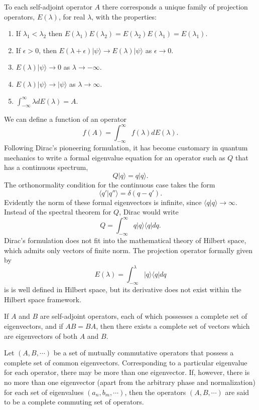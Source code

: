 \begin{newthem}
To each self-adjoint operator $A$ there corresponds a unique family of projection operators, $E(\lambda)$, for real $\lambda$, with the properties:
\begin{enumerate}
\item If $\lambda_1 < \lambda_2$ then $E(\lambda_1)E(\lambda_2) = E(\lambda_2)E(\lambda_1)= E(\lambda_1) $.
\item If $\epsilon > 0$, then $E(\lambda + \epsilon)|\psi\rangle \to E(\lambda)|\psi\rangle$ as $\epsilon \to 0$.
\item $E(\lambda)|\psi\rangle \to 0$ as $\lambda \to -\infty$.
\item $E(\lambda)|\psi\rangle \to |\psi\rangle$ as $\lambda \to \infty$.
\item $\int_{-\infty}^{\infty} \lambda dE(\lambda) = A$.
\end{enumerate}
\end{newthem}

\noindent
We can define a function of an operator
\[f(A) = \int_{-\infty}^{\infty} f(\lambda) dE(\lambda).\]
Following Dirac's pioneering formulation, it has become customary in
quantum mechanics to write a formal eigenvalue equation for an operator such as $Q$ that has a continuous spectrum,
\[Q |q\rangle = q|q\rangle.\]
The orthonormality condition for the continuous case takes the form
\[\langle q' | q'' \rangle = \delta(q-q').\]
Evidently the norm of these formal eigenvectors is infinite, since 
$\langle q | q \rangle \to \infty$. Instead of the spectral theorem for $Q$, Dirac would write
\[Q = \int_{-\infty}^{\infty} q |q\rangle\langle q| dq.\]
Dirac's formulation does not fit into the mathematical theory of Hilbert space, which admits only vectors of finite norm. The projection operator formally given by
\[E(\lambda) = \int_{-\infty}^{\lambda}  |q\rangle\langle q| dq \]
is is well defined in Hilbert space, but its derivative does not exist within the Hilbert space framework.\\


\begin{newthem}
If $A$ and $B$ are self-adjoint operators, each of which possesses a complete set of eigenvectors, and if $AB =BA$, then there exists a complete set of vectors which are eigenvectors of both $A$ and $B$.
\end{newthem}

\noindent
Let $(A, B, \cdots)$ be a set of mutually commutative operators that possess a complete set of common eigenvectors. Corresponding to a particular eigenvalue for each operator, there may be more than one eigenvector. If, however, there is no more than one eigenvector (apart from the arbitrary phase and normalization) for each set of eigenvalues $(a_n, b_m, \cdots)$, then the operators $(A, B, \cdots)$ are said to be a complete commuting set of operators.\\


